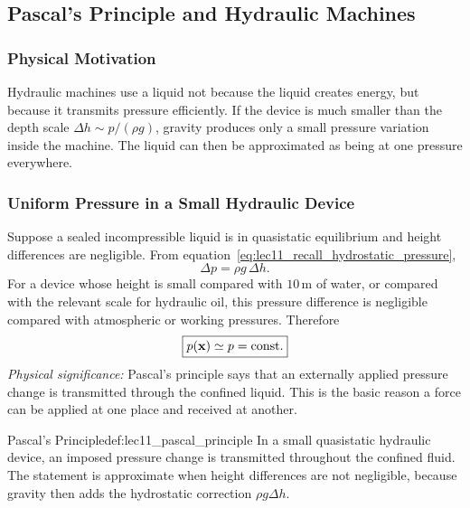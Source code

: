 \documentclass[../main.tex]{subfiles}
\begin{document}
\subsection{Pascal's Principle and Hydraulic Machines}\label{sec:lec11:pascal-hydraulics}

\subsubsection*{Physical Motivation}
Hydraulic machines use a liquid not because the liquid creates energy, but because it transmits pressure efficiently. If the device is much smaller than the depth scale $\Delta h\sim p/(\rho g)$, gravity produces only a small pressure variation inside the machine. The liquid can then be approximated as being at one pressure everywhere.

\subsubsection{Uniform Pressure in a Small Hydraulic Device}\label{subsec:lec11:uniform-pressure}
Suppose a sealed incompressible liquid is in quasistatic equilibrium and height differences are negligible. From equation~\eqref{eq:lec11_recall_hydrostatic_pressure},
\begin{equation}
  \Delta p = \rho g\,\Delta h.
  \label{eq:lec11_pressure_change_height}
\end{equation}
For a device whose height is small compared with $10\,\mathrm{m}$ of water, or compared with the relevant scale for hydraulic oil, this pressure difference is negligible compared with atmospheric or working pressures. Therefore
\begin{equation}
  \boxed{p(\mathbf{x})\simeq p=\mathrm{const}.}
  \label{eq:lec11_pascal_principle}
\end{equation}
\textit{Physical significance:} Pascal's principle says that an externally applied pressure change is transmitted through the confined liquid. This is the basic reason a force can be applied at one place and received at another.

\begin{Definition}{Pascal's Principle}{def:lec11_pascal_principle}
In a small quasistatic hydraulic device, an imposed pressure change is transmitted throughout the confined fluid. The statement is approximate when height differences are not negligible, because gravity then adds the hydrostatic correction $\rho g\Delta h$.
\end{Definition}
\end{document}
